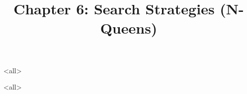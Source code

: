 \title[Search Strategies] %
{Chapter 6: Search Strategies (N-Queens)}

\subtitle
{} %



\mode<all>{

}
\mode<all>{

}


